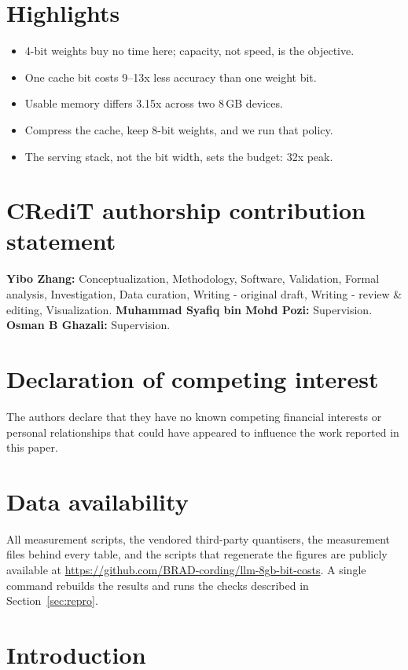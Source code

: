 \documentclass[5p]{elsarticle}
\begin{document}
\section*{Highlights}
\begin{itemize}
\item 4-bit weights buy no time here; capacity, not speed, is the objective.
\item One cache bit costs 9--13x less accuracy than one weight bit.
\item Usable memory differs 3.15x across two 8\,GB devices.
\item Compress the cache, keep 8-bit weights, and we run that policy.
\item The serving stack, not the bit width, sets the budget: 32x peak.
\end{itemize}

\section*{CRediT authorship contribution statement}
\textbf{Yibo Zhang:} Conceptualization, Methodology, Software, Validation,
Formal analysis, Investigation, Data curation, Writing - original draft,
Writing - review \& editing, Visualization. \textbf{Muhammad Syafiq bin Mohd
Pozi:} Supervision. \textbf{Osman B Ghazali:}
Supervision.

\section*{Declaration of competing interest}
The authors declare that they have no known competing financial interests or
personal relationships that could have appeared to influence the work reported in
this paper.

\section*{Data availability}
All measurement scripts, the vendored third-party quantisers, the measurement
files behind every table, and the scripts that regenerate the figures are
publicly available at
\url{https://github.com/BRAD-cording/llm-8gb-bit-costs}. A single command rebuilds
the results and runs the checks described in Section~\ref{sec:repro}.

\section{Introduction}
\label{sec:intro}
\end{document}
